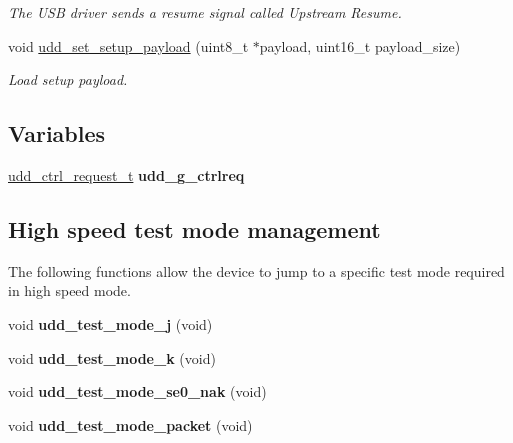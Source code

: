 \begin{DoxyCompactItemize}
\begin{DoxyCompactList}\small\item\em The U\-S\-B driver sends a resume signal called Upstream Resume. \end{DoxyCompactList}\item 
void \hyperlink{group__udd__group_ga017ef5ea7626be258c24d345218976f9}{udd\-\_\-set\-\_\-setup\-\_\-payload} (uint8\-\_\-t $\ast$payload, uint16\-\_\-t payload\-\_\-size)
\begin{DoxyCompactList}\small\item\em Load setup payload. \end{DoxyCompactList}\end{DoxyCompactItemize}
\subsection*{Variables}
\begin{DoxyCompactItemize}
\item 
\hypertarget{group__udd__group_ga360872da67c7f8ecebe1238bbd4a536e}{\hyperlink{structudd__ctrl__request__t}{udd\-\_\-ctrl\-\_\-request\-\_\-t} {\bfseries udd\-\_\-g\-\_\-ctrlreq}}\label{group__udd__group_ga360872da67c7f8ecebe1238bbd4a536e}

\end{DoxyCompactItemize}
\subsection*{High speed test mode management}
\label{_amgrp2db3720a79ccf99f281dc8b84ab95b6b}%
 The following functions allow the device to jump to a specific test mode required in high speed mode. \begin{DoxyCompactItemize}
\item 
\hypertarget{group__udd__group_ga43ba1e91e69f84c1481a659ff8eff143}{void {\bfseries udd\-\_\-test\-\_\-mode\-\_\-j} (void)}\label{group__udd__group_ga43ba1e91e69f84c1481a659ff8eff143}

\item 
\hypertarget{group__udd__group_ga2acd547bcd2b470ee4e1ce34087926a8}{void {\bfseries udd\-\_\-test\-\_\-mode\-\_\-k} (void)}\label{group__udd__group_ga2acd547bcd2b470ee4e1ce34087926a8}

\item 
\hypertarget{group__udd__group_gabec7e8b6464e92ca9c8f32c59113bcbb}{void {\bfseries udd\-\_\-test\-\_\-mode\-\_\-se0\-\_\-nak} (void)}\label{group__udd__group_gabec7e8b6464e92ca9c8f32c59113bcbb}

\item 
\hypertarget{group__udd__group_gab72f68f8d1a50f7e734595a2ff626380}{void {\bfseries udd\-\_\-test\-\_\-mode\-\_\-packet} (void)}\label{group__udd__group_gab72f68f8d1a50f7e734595a2ff626380}

\end{DoxyCompactItemize}
